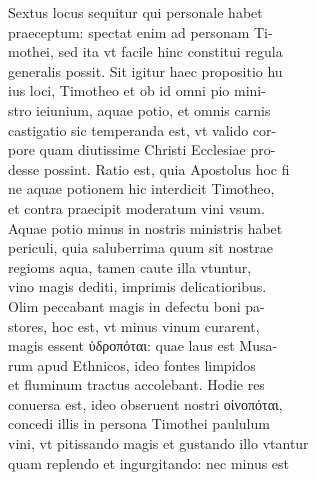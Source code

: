 \documentclass{article}
\begin{document}
\begin{pages}
                Sextus locus sequitur qui personale habet \\
                praeceptum: spectat enim ad personam Ti- \\
                mothei, sed ita vt facile hinc constitui regula \\
                generalis possit. Sit igitur haec propositio hu \\
                ius loci, Timotheo et ob id omni pio mini- \\
                stro ieiunium, aquae potio, et omnis carnis \\
                castigatio sic temperanda est, vt valido cor- \\
                pore quam diutissime Christi Ecclesiae pro- \\
                desse possint. Ratio est, quia Apostolus hoc fi \\
                ne aquae potionem hic interdicit Timotheo, \\
                et contra praecipit moderatum vini vsum. \\
                Aquae potio minus in nostris ministris habet \\
                periculi, quia saluberrima quum sit nostrae \\
                regioms aqua, tamen caute illa vtuntur, \\
                vino magis dediti, imprimis delicatioribus. \\
                Olim peccabant magis in defectu boni pa- \\
                stores, hoc est, vt minus vinum curarent, \\
                magis essent ὑδροπόται: quae laus est Musa- \\
                rum apud Ethnicos, ideo fontes limpidos \\
                et fluminum tractus accolebant. Hodie res \\
                conuersa est, ideo obseruent nostri οἰνοπόται, \\
                concedi illis in persona Timothei paululum \\
                vini, vt pitissando magis et gustando illo vtantur \\
                quam replendo et ingurgitando: nec minus est \\

\end{pages}
\end{document}
